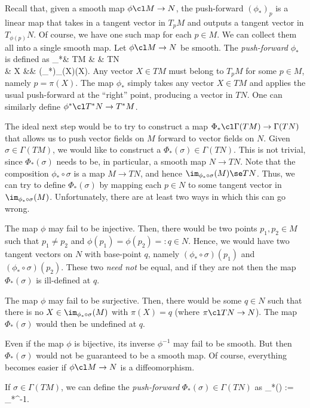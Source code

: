 Recall that, given a smooth map $\phi\cl M \to N$, the push-forward $(\phi_*)_p$ is a linear map that takes in a tangent vector in $T_pM$ and outputs a tangent vector in $T_{\phi(p)}N$. Of course, we have one such map for each $p\in M$. We can collect them all into a single smooth map.
\bd
Let $\phi\cl M \to N$ be smooth. The \emph{push-forward} $\phi_*$ is defined as
\phi_*\cl & TM & \to & TN\\
& X &\mapsto & (\phi_*)_{\pi(X)}(X).
\ei
\ed
Any vector $X\in TM$ must belong to $T_pM$ for some $p\in M$, namely $p=\pi(X)$. The map $\phi_*$ simply takes any vector $X\in TM$ and applies the usual push-forward at the ``right'' point, producing a vector in $TN$. One can similarly define $\phi^*\cl T^*N \to T^*M$.

The ideal next step would be to try to construct a map $\Phi_*\cl\Gamma(TM)\to\Gamma(TN)$ that allows us to push vector fields on $M$ forward to vector fields on $N$. Given $\sigma\in\Gamma(TM)$, we would like to construct a $\Phi_*(\sigma)\in\Gamma(TN)$. This is not trivial, since $\Phi_*(\sigma)$ needs to be, in particular, a smooth map $N\to TN$. Note that the composition $\phi_*\circ\sigma$ is a map $M\to TN$, and hence $\im_{\phi_*\circ\sigma}(M)\se TN$. Thus, we can try to define $\Phi_*(\sigma)$ by mapping each $p\in N$ to some tangent vector in $\im_{\phi_*\circ\sigma}(M)$. Unfortunately, there are at least two ways in which this can go wrong.
\ben
\item The map $\phi$ may fail to be injective. Then, there would be two points $p_1,p_2\in M$ such that $p_1\neq p_2$ and $\phi(p_1)=\phi(p_2)=:q\in N$. Hence, we would have two tangent vectors on $N$ with base-point $q$, namely $(\phi_*\circ\sigma)(p_1)$ and $(\phi_*\circ\sigma)(p_2)$. These two \emph{need not} be equal, and if they are not then the map $\Phi_*(\sigma)$ is ill-defined at $q$.
\item The map $\phi$ may fail to be surjective. Then, there would be some $q\in N$ such that there is no $X\in \im_{\phi_*\circ\sigma}(M)$ with $\pi(X)=q$ (where $\pi\cl TN\to N$). The map $\Phi_*(\sigma)$ would then be undefined at $q$.
\item Even if the map $\phi$ is bijective, its inverse $\phi^{-1}$ may fail to be smooth. But then $\Phi_*(\sigma)$ would not be guaranteed to be a smooth map.
\een
Of course, everything becomes easier if $\phi\cl M \to N$ is a diffeomorphism. 
\bse
{}
\ese
If $\sigma \in \Gamma(TM)$, we can define the \emph{push-forward} $\Phi_*(\sigma)\in \Gamma(TN)$ as
\bse
\Phi_*(\sigma) := \phi_*\circ\sigma\circ\phi^{-1}.
\ese

